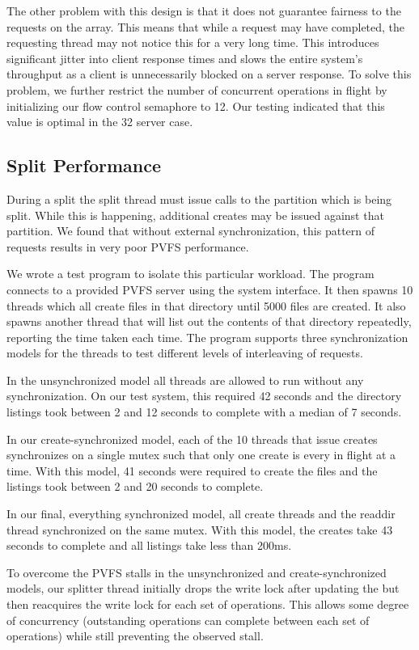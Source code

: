 \documentclass[onecolumn, 11pt, letterpaper]{article}
\begin{document}
The other problem with this design is that it does not guarantee fairness to
the requests on the array.  This means that while a request may have
completed, the requesting thread may not notice this for a very long time.
This introduces significant jitter into client response times and slows the
entire system's throughput as a client is unnecessarily blocked on a server
response.  To solve this problem, we further restrict the number of concurrent
operations in flight by initializing our flow control semaphore to 12.
Our testing indicated that this value is optimal in the 32 server case.

\subsection{Split Performance}
\label{section:splitperf}
During a split the split thread must issue  calls to the
partition which is being split.  While this is happening, additional creates
may be issued against that partition.  We found that without external
synchronization, this pattern of requests results in very poor PVFS
performance.

We wrote a test program to isolate this particular workload.  The program
connects to a provided PVFS server using the system interface.  It then spawns
10 threads which all create files in that directory until 5000 files are
created.  It also spawns another thread that will list out the contents of
that directory repeatedly, reporting the time taken each time.  The program
supports three synchronization models for the threads to test different levels
of interleaving of requests.

In the unsynchronized model all threads are allowed to run without any
synchronization.  On our test system, this required 42 seconds and the
directory listings took between 2 and 12 seconds to complete with a median of
7 seconds.

In our create-synchronized model, each of the 10 threads that issue creates
synchronizes on a single mutex such that only one create is every in flight at
a time.  With this model, 41 seconds were required to create the files and the
listings took between 2 and 20 seconds to complete.

In our final, everything synchronized model, all create threads and the
readdir thread synchronized on the same mutex.  With this model, the creates
take 43 seconds to complete and all listings take less than 200ms.

To overcome the PVFS stalls in the unsynchronized and create-synchronized
models, our splitter thread initially drops the write lock after updating the
 but then reacquires the write lock for each set of
 operations.  This allows some degree of concurrency
(outstanding operations can complete between each set of operations) while
still preventing the observed stall.
\end{document}
